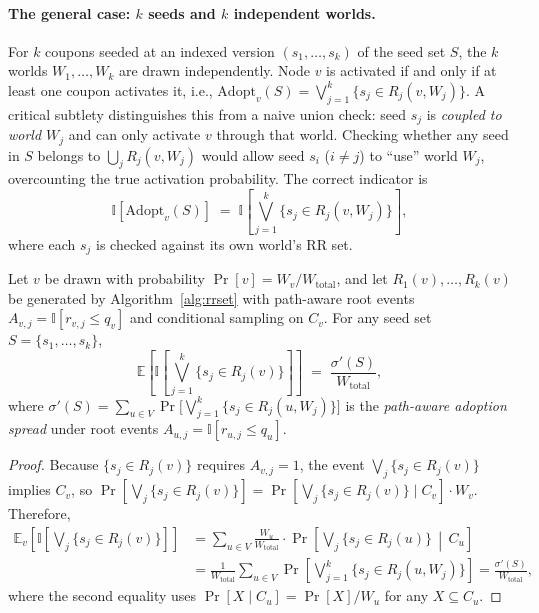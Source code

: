 \documentclass[sigconf]{acmart}
\begin{document}
\paragraph{The general case: $k$ seeds and $k$ independent worlds.}
For $k$ coupons seeded at an indexed version $(s_1, \ldots, s_k)$ of the seed set $S$, the $k$ worlds $W_1, \ldots, W_k$ are drawn independently. Node $v$ is activated if and only if at least one coupon activates it, i.e., $\mathrm{Adopt}_v(S) = \bigvee_{j=1}^k \{s_j \in R_j(v, W_j)\}$.
A critical subtlety distinguishes this from a naive union check: seed $s_j$ is \emph{coupled to world $W_j$} and can only activate $v$ through that world. Checking whether any seed in $S$ belongs to $\bigcup_j R_j(v, W_j)$ would allow seed $s_i$ ($i \neq j$) to ``use'' world $W_j$, overcounting the true activation probability. The correct indicator is
\[
  \mathbb{I}[\mathrm{Adopt}_v(S)] \;=\; \mathbb{I}\!\left[\bigvee_{j=1}^{k} \{s_j \in R_j(v,W_j)\}\right],
\]
where each $s_j$ is checked against its own world's RR set.

\begin{lemma}
\label{lem:unbiased}
Let $v$ be drawn with probability $\Pr[v] = W_v / W_{\mathrm{total}}$, and let $R_1(v), \ldots, R_k(v)$ be generated by Algorithm~\ref{alg:rrset} with path-aware root events $A_{v,j} = \mathbb{I}[r_{v,j} \leq q_v]$ and conditional sampling on $C_v$. For any seed set $S = \{s_1, \ldots, s_k\}$,
\begin{equation}
  \mathbb{E}\!\left[\mathbb{I}\!\left[\bigvee_{j=1}^{k} \{s_j \in R_j(v)\}\right]\right]
  \;=\; \frac{\sigma'(S)}{W_{\mathrm{total}}},
\end{equation}
where $\sigma'(S) = \sum_{u \in V} \Pr\!\bigl[\bigvee_{j=1}^k \{s_j \in R_j(u,W_j)\}\bigr]$ is the \emph{path-aware adoption spread} under root events $A_{u,j} = \mathbb{I}[r_{u,j} \leq q_u]$.
\end{lemma}

\begin{proof}
Because $\{s_j \in R_j(v)\}$ requires $A_{v,j}=1$, the event $\bigvee_j\{s_j \in R_j(v)\}$ implies $C_v$, so
$\Pr[\bigvee_j\{s_j \in R_j(v)\}] = \Pr[\bigvee_j\{s_j \in R_j(v)\} \mid C_v]\cdot W_v$.
Therefore,
\begin{align*}
  \mathbb{E}_v\!\left[\mathbb{I}\!\left[\bigvee_j \{s_j \in R_j(v)\}\right]\right]
  &= \sum_{u \in V}\frac{W_u}{W_{\mathrm{total}}}
     \cdot \Pr\!\left[\bigvee_j \{s_j \in R_j(u)\} \,\middle|\, C_u\right] \\
  &= \frac{1}{W_{\mathrm{total}}}\sum_{u \in V}
     \Pr\!\left[\bigvee_{j=1}^{k} \{s_j \in R_j(u,W_j)\}\right]
  = \frac{\sigma'(S)}{W_{\mathrm{total}}},
\end{align*}
where the second equality uses $\Pr[X \mid C_u] = \Pr[X]/W_u$ for any $X \subseteq C_u$.
\end{proof}
\end{document}
